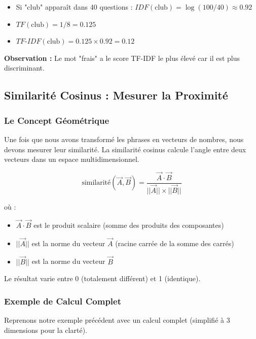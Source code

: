 \documentclass[11pt,a4paper]{article}
\begin{document}
\begin{exemple}
\begin{itemize}
    \item Si "club" apparaît dans 40 questions : $IDF(\text{club}) = \log(100/40) \approx 0.92$
    \item $TF(\text{club}) = 1/8 = 0.125$
    \item $TF\text{-}IDF(\text{club}) = 0.125 \times 0.92 = 0.12$
\end{itemize}

\vspace{0.3cm}
\textbf{Observation :} Le mot "frais" a le score TF-IDF le plus élevé car il est plus discriminant.
\end{exemple}

\clearpage

\subsection{Similarité Cosinus : Mesurer la Proximité}

\subsubsection{Le Concept Géométrique}

Une fois que nous avons transformé les phrases en vecteurs de nombres, nous devons mesurer leur similarité. La similarité cosinus calcule l'angle entre deux vecteurs dans un espace multidimensionnel.

\[
\text{similarité}(\vec{A}, \vec{B}) = \frac{\vec{A} \cdot \vec{B}}{||\vec{A}|| \times ||\vec{B}||}
\]

où :
\begin{itemize}
    \item $\vec{A} \cdot \vec{B}$ est le produit scalaire (somme des produits des composantes)
    \item $||\vec{A}||$ est la norme du vecteur $\vec{A}$ (racine carrée de la somme des carrés)
    \item $||\vec{B}||$ est la norme du vecteur $\vec{B}$
\end{itemize}

Le résultat varie entre 0 (totalement différent) et 1 (identique).

\subsubsection{Exemple de Calcul Complet}

Reprenons notre exemple précédent avec un calcul complet (simplifié à 3 dimensions pour la clarté).
\end{document}
